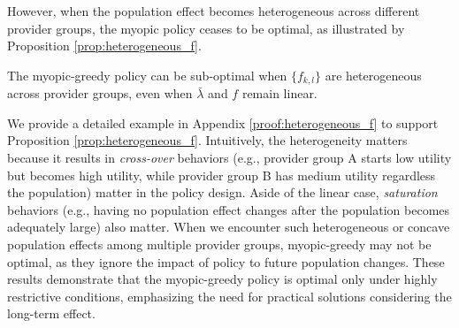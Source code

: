 However, when the population effect becomes heterogeneous across different provider groups, the myopic policy ceases to be optimal, as illustrated by Proposition \ref{prop:heterogeneous_f}.

\begin{proposition}\label{prop:heterogeneous_f}
The myopic-greedy policy can be sub-optimal when $\{f_{k,l}\}$ are heterogeneous across provider groups, even when $\bar{\lambda}$ and $f$ remain linear.
\end{proposition}

We provide a detailed example in Appendix \ref{proof:heterogeneous_f} to support Proposition \ref{prop:heterogeneous_f}. Intuitively, the heterogeneity matters because it results in \textit{cross-over} behaviors (e.g., provider group A starts low utility but becomes high utility, while provider group B has medium utility regardless the population) matter in the policy design. Aside of the linear case, \textit{saturation} behaviors (e.g., having no population effect changes after the population becomes adequately large) also matter. When we encounter such heterogeneous or concave population effects among multiple provider groups, myopic-greedy may not be optimal, as they ignore the impact of policy to future population changes.
These results demonstrate that the myopic-greedy policy is optimal only under highly restrictive conditions, emphasizing the need for practical solutions considering the long-term effect. 

